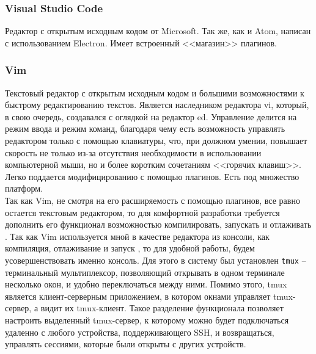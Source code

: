 \subsubsection{Visual Studio Code}\label{sec:ch2/sec1/sub2/sub4}
Редактор с открытым исходным кодом от Microsoft. Так же, как и Atom, написан с использованием Electron.
Имеет встроенный <<магазин>> плагинов.

\subsubsection{Vim}\label{sec:ch2/sec1/sub2/sub5}
Текстовый редактор с открытым исходным кодом и большими возможностями к
быстрому редактированию текстов. Является наследником редактора vi, который, в свою
очередь, создавался с оглядкой на редактор ed. Управление делится на
режим ввода и режим команд, благодаря чему есть возможность управлять 
редактором только с помощью клавиатуры, что, при должном умении, повышает скорость
не только из-за отсутствия необходимости в использовании компьютерной мыши, но и
более коротким сочетаниям  <<горячих клавиш>>. Легко поддается модифицированию с помощью плагинов.
Есть под множество платформ.
\\

Так как Vim, не смотря на его расширяемость с помощью плагинов, все равно остается текстовым редактором,
то для комфортной разработки требуется дополнить его функционал возможностью компилировать, 
запускать и отлаживать {\ProgModule}. Так как Vim используется мной в качестве редактора из
консоли, как компиляция, отлаживание и запуск {\ProgModule}, то для удобной работы, будем 
усовершенствовать именно консоль.
Для этого в систему был установлен \verb|tmux| -- терминальный мультиплексор,
позволяющий открывать в одном терминале несколько окон, и удобно переключаться
между ними. Помимо этого, tmux является клиент-серверным приложением, в котором
окнами управляет tmux-сервер, а видит их tmux-клиент. Такое разделение
функционала позволяет настроить выделенный tmux-сервер, к которому можно будет
подключаться удаленно с любого устройства, поддерживающего SSH, и возвращаться,
управлять сессиями, которые были открыты с других устройств.

